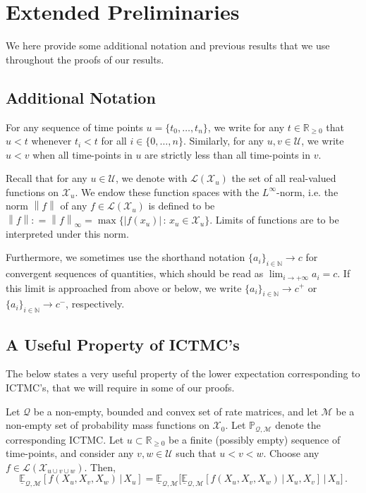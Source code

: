 \documentclass[twoside,11pt]{article}
\newcommand{\nats}{\mathbb{N}}
\newcommand{\reals}{\mathbb{R}}
\newcommand{\realsnonneg}{\reals_{\geq 0}}
\newcommand{\states}{\mathcal{X}}
\newcommand{\lexp}{\underline{\mathbb{E}}_{\rateset,\mathcal{M}}}
\newcommand{\gambles}{\mathcal{L}}
\newcommand{\rateset}{\mathcal{Q}}
\newcommand{\norm}[1]{\left\lVert #1 \right\rVert}
\newcommand{\abs}[1]{\left\vert #1 \right\vert}
\newcommand{\coloneqq}{:\!=}
\begin{document}
\newpage


\section{Extended Preliminaries}

We here provide some additional notation and previous results that we use throughout the proofs of our results.

\subsection{Additional Notation}

For any sequence of time points $u=\{t_0,\ldots,t_n\}$, we write for any $t\in\realsnonneg$ that $u<t$ whenever $t_i<t$ for all $i\in\{0,\ldots,n\}$. Similarly, for any $u,v\in\mathcal{U}$, we write $u< v$ when all time-points in $u$ are strictly less than all time-points in $v$.

Recall that for any $u\in\mathcal{U}$, we denote with $\gambles(\states_u)$ the set of all real-valued functions on $\states_u$. We endow these function spaces with the $L^\infty$-norm, i.e. the norm $\norm{f}$ of any $f\in\gambles(\states_u)$ is defined to be $\norm{f}\coloneqq\norm{f}_\infty=\max\{\abs{f(x_u)}\,:\,x_u\in\states_u\}$. Limits of functions are to be interpreted under this norm.

Furthermore, we sometimes use the shorthand notation $\{a_i\}_{i\in\nats}\to c$ for convergent sequences of quantities, which should be read as $\lim_{i\to+\infty}a_i=c$. If this limit is approached from above or below, we write $\{a_i\}_{i\in\nats}\to c^+$ or $\{a_i\}_{i\in\nats}\to c^-$, respectively.

\subsection{A Useful Property of ICTMC's}

The below states a very useful property of the lower expectation corresponding to ICTMC's, that we will require in some of our proofs.

\begin{lemma}\cite[Theorem 6.5]{krak2016ictmc}\label{lemma:iterated_lower}
Let $\rateset$ be a non-empty, bounded and convex set of rate matrices, and let $\mathcal{M}$ be a non-empty set of probability mass functions on $\states_0$. Let $\mathbb{P}_{\rateset,\mathcal{M}}$ denote the corresponding ICTMC.
Let $u\subset\realsnonneg$ be a finite (possibly empty) sequence of time-points, and consider any $v,w\in\mathcal{U}$ such that $u<v<w$. Choose any $f\in\gambles(\states_{u\cup v\cup w})$. Then,
\begin{equation*}
\lexp[f(X_u,X_v,X_w)\,\vert\,X_u] = \lexp\bigl[\lexp[f(X_u,X_v,X_w)\,\vert\,X_u,X_v]\,\vert\,X_u\bigr]\,.
\end{equation*}
\end{lemma}
\end{document}

